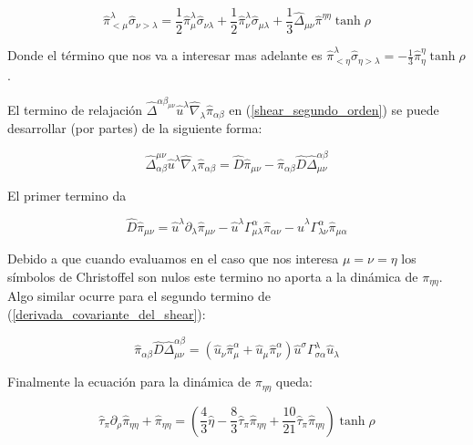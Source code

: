 \documentclass[11pt,a4paper]{article}
\begin{document}
\begin{equation}
\hat{\pi}^{\lambda}_{<\mu}\hat{\sigma}_{{\nu>}{\lambda}}=
\frac{1}{2}\hat{\pi}^{\lambda}_{\mu}\hat{\sigma}_{{\nu}{\lambda}}
+\frac{1}{2}\hat{\pi}^{\lambda}_{\nu}\hat{\sigma}_{{\mu}{\lambda}}
+\frac{1}{3}\hat{\Delta}_{{\mu}{\nu}}\hat{\pi}^{{\eta}{\eta}}\tanh\rho
\end{equation}

Donde el término que nos va a interesar mas adelante es $\hat{\pi}^{\lambda}_{<\eta}\hat{\sigma}_{{\eta>}{\lambda}}=-\frac{1}{3}\hat{\pi}^{\eta}_{\eta}\tanh\rho$.


El termino de relajación $\hat{\Delta}^{{\alpha}{\beta}_{{\mu}{\nu}}}\hat{u}^{\lambda}\hat{\nabla}_{\lambda}\hat{\pi}_{{\alpha}{\beta}}$ en (\ref{shear_segundo_orden}) se puede desarrollar (por partes) de la siguiente forma:

\begin{equation}
\hat{\Delta}^{{\mu}{\nu}}_{{\alpha}{\beta}}\hat{u}^{\lambda}\hat{\nabla}_{\lambda}\hat{\pi}_{{\alpha}{\beta}}=
\hat{D}\hat{\pi}_{{\mu}{\nu}}-
\hat{\pi}_{{\alpha}{\beta}}\hat{D}\hat{\Delta}^{{\alpha}{\beta}}_{{\mu}{\nu}}
\end{equation}

El primer termino da

\begin{equation}
\hat{D}\hat{\pi}_{{\mu}{\nu}}=
\hat{u}^{\lambda}\partial_{\lambda}\hat{\pi}_{{\mu}{\nu}}
-\hat{u}^{\lambda}\Gamma^{\alpha}_{{\mu}{\lambda}}\hat{\pi}_{{\alpha}{\nu}}
-\hat{u}^{\lambda}\Gamma^{\alpha}_{{\lambda}{\nu}}\hat{\pi}_{{\mu}{\alpha}}
\label{derivada_covariante_del_shear}
\end{equation}

Debido a que cuando evaluamos en el caso que nos interesa $\mu=\nu=\eta$ los símbolos de Christoffel son nulos este termino no aporta a la dinámica de $\pi_{{\eta}{\eta}}$. Algo similar ocurre para el segundo termino de (\ref{derivada_covariante_del_shear}):

\begin{equation}
\hat{\pi}_{{\alpha}{\beta}}\hat{D}\hat{\Delta}^{{\alpha}{\beta}}_{{\mu}{\nu}}=(\hat{u}_{\nu}\hat{\pi}^{\alpha}_{\mu}+\hat{u}_{\mu}\hat{\pi}^{\alpha}_{\nu})\hat{u}^{\sigma}\Gamma^{\lambda}_{{\sigma}{\alpha}}\hat{u}_{\lambda}
\end{equation}

Finalmente la ecuación  para la dinámica de $\pi_{{\eta}{\eta}}$ queda:

\begin{equation}
\hat{\tau}_{\pi}\partial_{\rho}\hat{\pi}_{{\eta}{\eta}}
+\hat{\pi}_{{\eta}{\eta}}=
(\frac{4}{3}\hat{\eta}-\frac{8}{3}\hat{\tau}_{\pi}\hat{\pi}_{{\eta}{\eta}}
+\frac{10}{21}\hat{\tau}_{\pi}\hat{\pi}_{{\eta}{\eta}})\tanh\rho
\end{equation}
\end{document}
